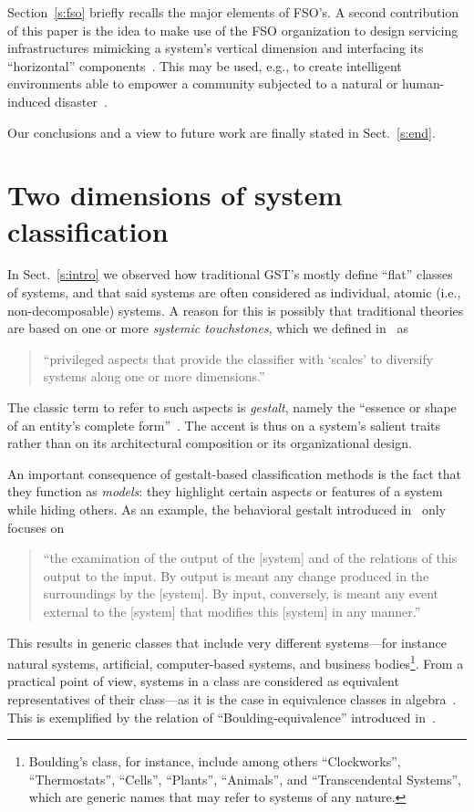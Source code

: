 \documentclass[twocolumn]{svjour3}
\begin{document}
Section~\ref{s:fso} briefly recalls the major elements
of FSO's.
A second contribution of this paper is the idea to make use of
the FSO organization
to design servicing infrastructures mimicking a system's vertical dimension and interfacing
its ``horizontal'' components~\cite{DFSB13a,DF15c}.
This may be used, e.g., to create intelligent environments
able to empower a community subjected to a natural or human-induced disaster~\cite{DFSB14}.


Our conclusions and a view to future work are finally stated in Sect.~\ref{s:end}.



\section{Two dimensions of system classification}\label{s:clas}
In Sect.~\ref{s:intro} we observed how traditional GST's mostly define
``flat'' classes of systems, and that said systems are often considered as
individual, atomic (i.e., non-decomposable) systems.
A reason for this is possibly that traditional theories are based on one or more
\emph{systemic touchstones}, which we defined in~\cite{DF14c} as
\begin{quote}
``privileged aspects that provide the classifier with `scales' to diversify systems along one or more dimensions.''
\end{quote}
The classic term to refer to such aspects is \emph{gestalt}, namely the
``essence or shape of an entity's complete form''~\cite{Jacks10}.
The accent is thus on a system's salient traits rather than on its architectural composition
or its organizational design.


An important consequence of gestalt-based classification methods is the fact that they
function as \emph{models}:
they highlight certain aspects or features of a system while hiding others.
As an example, the behavioral gestalt introduced in~\cite{RWB43} only focuses on
\begin{quote}
``the examination of the
output of the [system] and of the relations of this
output to the input. By output is meant any
change produced in the surroundings by the
[system].  By input, conversely, is meant any
event external to the [system] that modifies this
[system] in any manner.''
\end{quote}
This results in generic classes that include very different systems---for instance  natural systems,
artificial, computer-based systems, and
business bodies\footnote{Boulding's class, for instance,
	include among others ``Clockworks'', ``Thermostats'', ``Cells'', ``Plants'', ``Animals'', and
	``Transcendental Systems'', which are generic names that may refer to systems of any nature.}.
From a practical point of view, systems in a class are considered as equivalent representatives
of their class---as it is the case in equivalence classes in algebra~\cite{Sprugnoli}. This is
exemplified by the relation of ``Boulding-equivalence'' introduced in~\cite{DF12a}.
\end{document}
